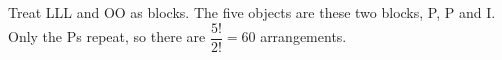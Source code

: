 Treat LLL and OO as blocks. The five objects are these two blocks, P, P and I. Only the Ps repeat, so there are $\dfrac{5!}{2!}=\boxed{60}$ arrangements.
